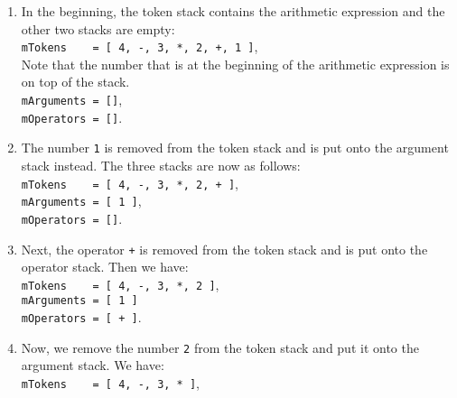 \begin{enumerate}
\item In the beginning, the token stack contains the arithmetic expression and the other two stacks
      are empty: \\[0.2cm]
      \hspace*{1.3cm} 
      \texttt{mTokens \ \ \ = [ 4, -, 3,
        *, 2, +, 1 ]}, 
      \\[0.2cm]
      Note that the number that is at the beginning of the arithmetic expression is on top of the
      stack.  \\[0.2cm]
      \hspace*{1.3cm} \texttt{mArguments = []}, \\[0.2cm]
      \hspace*{1.3cm} \texttt{mOperators = []}. 
\item The number \texttt{1} is removed from the token stack and is put onto the argument stack
      instead.  The three stacks are now as follows: \\[0.2cm]
      \hspace*{1.3cm} \texttt{mTokens \ \ \ = [ 4, -, 3, *, 2, + ]}, \\[0.2cm]
      \hspace*{1.3cm} \texttt{mArguments = [ 1 ]}, \\[0.2cm]
      \hspace*{1.3cm} \texttt{mOperators = []}. 
\item Next, the operator \texttt{+} is removed from the token stack and is put
      onto the operator stack.  Then we have: \\[0.2cm]
      \hspace*{1.3cm} \texttt{mTokens \ \ \ = [ 4, -, 3, *, 2 ]}, \\[0.2cm]
      \hspace*{1.3cm} \texttt{mArguments = [ 1 ]} \\[0.2cm]
      \hspace*{1.3cm} \texttt{mOperators = [ + ]}. 
\item Now, we remove the number \texttt{2} from the  token stack and put it onto the argument stack.
      We have: \\[0.2cm]
      \hspace*{1.3cm} \texttt{mTokens \ \ \ = [ 4, -, 3, * ]}, \\[0.2cm]

\end{enumerate}
